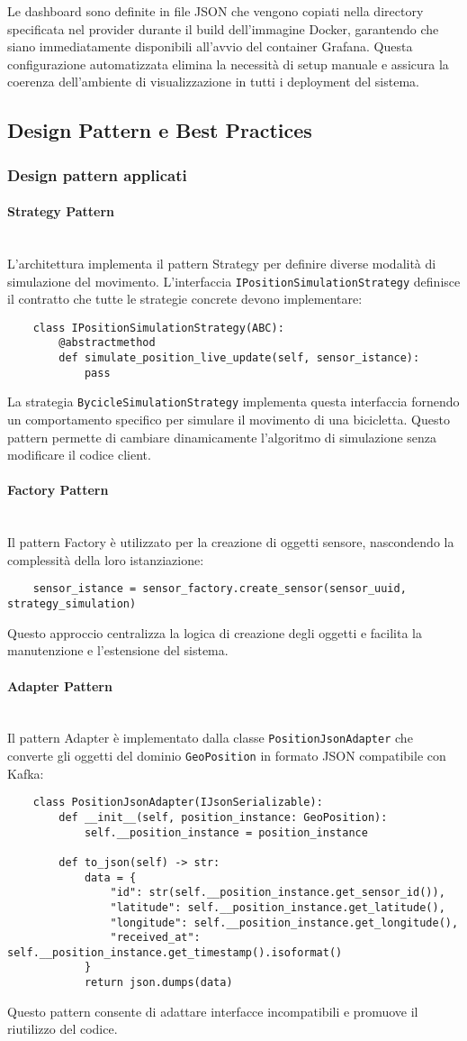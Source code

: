 \documentclass[10pt]{article}
\newcommand{\myparagraph}[1]{\paragraph{#1}\mbox{}\\}
\begin{document}
        Le dashboard sono definite in file JSON che vengono copiati nella directory specificata nel provider durante il build dell'immagine Docker, garantendo che siano immediatamente disponibili all'avvio del container Grafana. Questa configurazione automatizzata elimina la necessità di setup manuale e assicura la coerenza dell'ambiente di visualizzazione in tutti i deployment del sistema.

\subsection{Design Pattern e Best Practices}
\subsubsection{Design pattern applicati}
    \myparagraph{Strategy Pattern}
    L'architettura implementa il pattern Strategy per definire diverse modalità di simulazione del movimento. L'interfaccia \texttt{IPositionSimulationStrategy} definisce il contratto che tutte le strategie concrete devono implementare:
    \begin{lstlisting}
    class IPositionSimulationStrategy(ABC):
        @abstractmethod
        def simulate_position_live_update(self, sensor_istance):
            pass
    \end{lstlisting}
    La strategia \texttt{BycicleSimulationStrategy} implementa questa interfaccia fornendo un comportamento specifico per simulare il movimento di una bicicletta. Questo pattern permette di cambiare dinamicamente l'algoritmo di simulazione senza modificare il codice client.

    \myparagraph{Factory Pattern}
    Il pattern Factory è utilizzato per la creazione di oggetti sensore, nascondendo la complessità della loro istanziazione:
    \begin{lstlisting}
    sensor_istance = sensor_factory.create_sensor(sensor_uuid, strategy_simulation)
    \end{lstlisting}
    Questo approccio centralizza la logica di creazione degli oggetti e facilita la manutenzione e l'estensione del sistema.

    \myparagraph{Adapter Pattern}
    Il pattern Adapter è implementato dalla classe \texttt{PositionJsonAdapter} che converte gli oggetti del dominio \texttt{GeoPosition} in formato JSON compatibile con Kafka:
    \begin{lstlisting}
    class PositionJsonAdapter(IJsonSerializable):
        def __init__(self, position_instance: GeoPosition):
            self.__position_instance = position_instance
            
        def to_json(self) -> str:
            data = {
                "id": str(self.__position_instance.get_sensor_id()),
                "latitude": self.__position_instance.get_latitude(),
                "longitude": self.__position_instance.get_longitude(),
                "received_at": self.__position_instance.get_timestamp().isoformat()
            }
            return json.dumps(data)
    \end{lstlisting}
    Questo pattern consente di adattare interfacce incompatibili e promuove il riutilizzo del codice.
\end{document}
